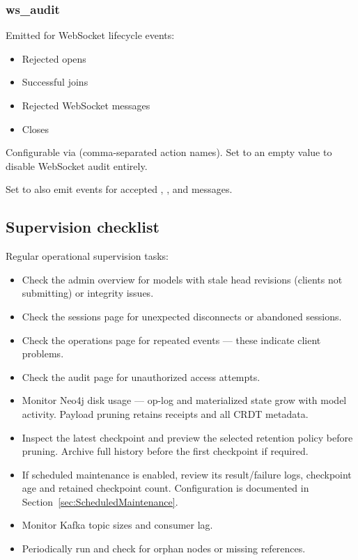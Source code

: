 \subsubsection{ws\_audit}

Emitted for WebSocket lifecycle events:

\begin{itemize}
\item Rejected opens
\item Successful joins
\item Rejected WebSocket messages
\item Closes
\end{itemize}

Configurable via  (comma-separated
action names). Set to an empty value to disable WebSocket audit entirely.

Set  to also emit
 events for accepted
, ,  and
 messages.

\subsection{Supervision checklist}

Regular operational supervision tasks:

\begin{itemize}
\item Check the admin overview for models with stale head revisions (clients
  not submitting) or integrity issues.
\item Check the sessions page for unexpected disconnects or abandoned
  sessions.
\item Check the operations page for repeated 
  events --- these indicate client problems.
\item Check the audit page for unauthorized access attempts.
\item Monitor Neo4j disk usage --- op-log and materialized state grow with
  model activity. Payload pruning retains receipts and all CRDT metadata.
\item Inspect the latest checkpoint and preview the selected retention policy
  before pruning. Archive full history before the first checkpoint if required.
\item If scheduled maintenance is enabled, review its result/failure logs,
  checkpoint age and retained checkpoint count. Configuration is documented
  in Section~\ref{sec:ScheduledMaintenance}.
\item Monitor Kafka topic sizes and consumer lag.
\item Periodically run  and
  check for orphan nodes or missing references.
\end{itemize}
